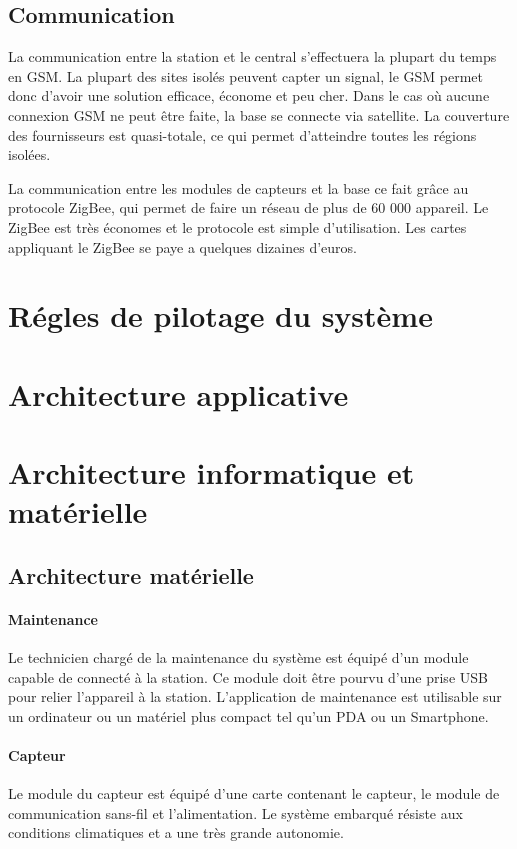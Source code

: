 \subsection{Communication}
La communication entre la station et le central s’effectuera la plupart du temps en GSM. La plupart des sites isolés peuvent capter un signal, le GSM permet donc d’avoir une solution efficace, économe et peu cher. Dans le cas où aucune connexion GSM ne peut être faite, la base se connecte via satellite. La couverture des fournisseurs est quasi-totale, ce qui permet d’atteindre toutes les régions isolées. 

La communication entre les modules de capteurs et la base ce fait grâce au protocole ZigBee, qui permet de faire un réseau de plus de 60 000 appareil. Le ZigBee est très économes et le protocole est simple d’utilisation. Les cartes appliquant le ZigBee se paye a quelques dizaines d’euros. 

\section{Régles de pilotage du système}

\section{Architecture applicative}

\section{Architecture informatique et matérielle}

\subsection{Architecture matérielle}

\paragraph{Maintenance} Le technicien chargé de la maintenance du système est équipé d’un module capable de connecté à la station. Ce module doit être pourvu d’une prise USB pour relier l’appareil à la station. L’application de maintenance est utilisable sur un ordinateur  ou un matériel plus compact tel qu’un PDA ou un Smartphone. 
\paragraph{Capteur} Le module du capteur est équipé d’une carte contenant le capteur, le module de communication sans-fil et l’alimentation. Le système embarqué résiste aux conditions climatiques et a une très grande autonomie.
